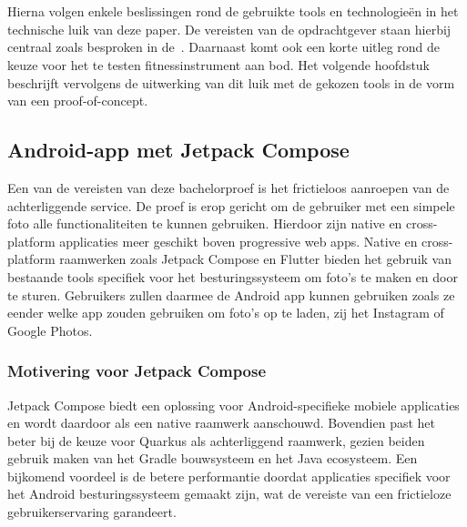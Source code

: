 
\chapter{}
\label{ch:shortlist}
Hierna volgen enkele beslissingen rond de gebruikte tools en technologie\"en in het technische luik van deze paper.
De vereisten van de opdrachtgever staan hierbij centraal zoals besproken in de~.
Daarnaast komt ook een korte uitleg rond de keuze voor het te testen fitnessinstrument aan bod.
Het volgende hoofdstuk beschrijft vervolgens de uitwerking van dit luik met de gekozen tools in de vorm van een proof-of-concept.

\section{Android-app met Jetpack Compose}
\label{sec:keuze-framework-voor-android-app}
Een van de vereisten van deze bachelorproef is het frictieloos aanroepen van de achterliggende service.
De proef is erop gericht om de gebruiker met een simpele foto alle functionaliteiten te kunnen gebruiken.
Hierdoor zijn native en cross-platform applicaties meer geschikt boven progressive web apps.
Native en cross-platform raamwerken zoals Jetpack Compose en Flutter bieden het gebruik van bestaande tools specifiek voor het besturingssysteem om foto's te maken en door te sturen.
Gebruikers zullen daarmee de Android app kunnen gebruiken zoals ze eender welke app zouden gebruiken om foto's op te laden, zij het Instagram of Google Photos.

\subsection{Motivering voor Jetpack Compose}
\label{subsec:motivering-voor-jetpack-compose}
Jetpack Compose biedt een oplossing voor Android-specifieke mobiele applicaties en wordt daardoor als een native raamwerk aanschouwd.
Bovendien past het beter bij de keuze voor Quarkus als achterliggend raamwerk, gezien beiden gebruik maken van het Gradle bouwsysteem en het Java ecosysteem.
Een bijkomend voordeel is de betere performantie doordat applicaties specifiek voor het Android besturingssysteem gemaakt zijn, wat de vereiste van een frictieloze gebruikerservaring garandeert.

